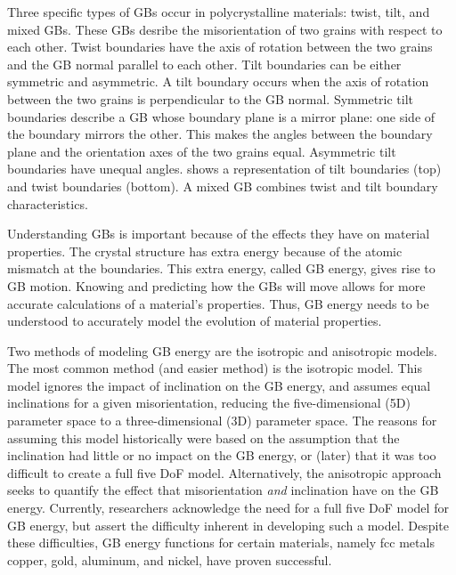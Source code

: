 \documentclass[twoside,senior]{BYUPhys}
\begin{document}
Three specific types of GBs occur in polycrystalline materials: twist, tilt, and mixed GBs.\cite{lejcek2010, rohrer2011}  These GBs desribe the misorientation of two grains with respect to each other.  Twist boundaries have the axis of rotation between the two grains and the GB normal parallel to each other. Tilt boundaries can be either symmetric and asymmetric.  A tilt boundary occurs when the axis of rotation between the two grains is perpendicular to the GB normal.  Symmetric tilt boundaries describe a GB whose boundary plane is a mirror plane: one side of the boundary mirrors the other.  This makes the angles between the boundary plane and the orientation axes of the two grains equal. Asymmetric tilt boundaries have unequal angles.   shows a representation of tilt boundaries (top) and twist boundaries (bottom).  A mixed GB combines twist and tilt boundary characteristics.

Understanding GBs is important because of the effects they have on material properties.\cite{patala2013, homer2015, bulatov2014}  The crystal structure has extra energy because of the atomic mismatch at the boundaries.  This extra energy, called GB energy, gives rise to GB motion.  Knowing and predicting how the GBs will move allows for more accurate calculations of a material's properties.  Thus, GB energy needs to be understood to accurately model the evolution of material properties.

Two methods of modeling GB energy are the isotropic and anisotropic models.  The most common method (and easier method) is the isotropic model.  This model ignores the impact of inclination on the GB energy, and assumes equal inclinations for a given misorientation, reducing the five-dimensional (5D) parameter space to a three-dimensional (3D) parameter space.  The reasons for assuming this model historically were based on the assumption that the inclination had little or no impact on the GB energy, or (later) that it was too difficult to create a full five DoF model.\cite{homer2015}  Alternatively, the anisotropic approach seeks to quantify the effect that misorientation \emph{and} inclination have on the GB energy.  Currently, researchers acknowledge the need for a full five DoF model for GB energy, but assert the difficulty inherent in developing such a model.\cite{rohrer2011, lejcek2010, homer2015}  Despite these difficulties, GB energy functions for certain materials, namely fcc metals copper, gold, aluminum, and nickel, have proven successful.\cite{bulatov2014}
\end{document}
